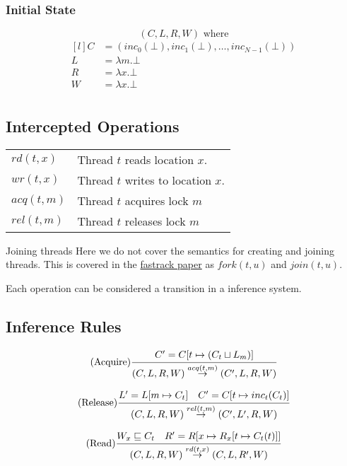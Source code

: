\subsubsection{Initial State}
\[(C, L, R, W) \text{ where}\]
\[\begin{matrix*}[l]
    C & = (inc_0(\bot), inc_1(\bot), \dots, inc_{N-1}(\bot)) \\
    L & = \lambda m . \bot \\
    R & = \lambda x . \bot \\
    W & = \lambda x . \bot \\
\end{matrix*}\]

\subsection{Intercepted Operations}
\begin{center}
    \begin{tabular}{l p{}}
        $rd(t,x)$ & Thread $t$ reads location $x$. \\
        $wr(t,x)$ & Thread $t$ writes to location $x$. \\
        $acq(t,m)$ & Thread $t$ acquires lock $m$ \\
        $rel(t,m)$ & Thread $t$ releases lock $m$ \\
    \end{tabular}
\end{center}

\begin{sidenotebox}{Joining threads}
    Here we do not cover the semantics for creating and joining threads. This is covered in the \href{https://users.soe.ucsc.edu/~cormac/papers/pldi09.pdf}{fastrack paper} as $fork(t,u)$ and $join(t,u)$.
\end{sidenotebox}

Each operation can be considered a transition in a inference system.

\subsection{Inference Rules}
\[(\text{Acquire})\cfrac{C' = C[t \mapsto (C_t \sqcup L_m)]}{(C,L,R,W) \overset{acq(t,m)}{\to} (C', L, R, W)} \]

\[(\text{Release})\cfrac{L' = L[m \mapsto C_t] \quad C' = C[t \mapsto inc_t(C_t)]}{(C,L,R,W) \overset{rel(t,m)}{\to} (C', L', R, W)} \]

\[(\text{Read})\cfrac{W_x \sqsubseteq C_t \quad R' = R[x \mapsto R_x[t \mapsto C_t(t)]]}{(C,L,R,W) \overset{rd(t,x)}{\to} (C,L,R',W)}\]


